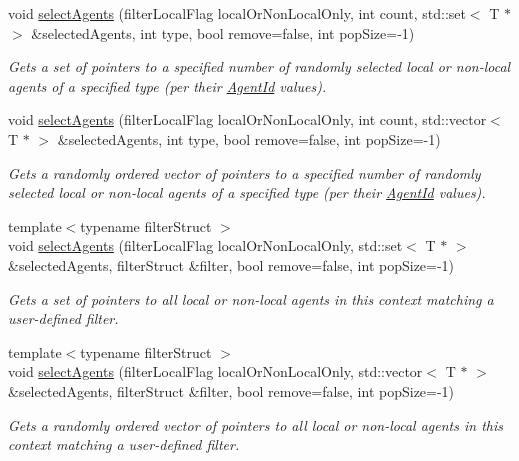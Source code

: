 \begin{DoxyCompactItemize}
void \hyperlink{classrepast_1_1_shared_context_a1899bd475820969bb98e1d5d55c4e378}{select\-Agents} (filter\-Local\-Flag local\-Or\-Non\-Local\-Only, int count, std\-::set$<$ T $\ast$ $>$ \&selected\-Agents, int type, bool remove=false, int pop\-Size=-\/1)
\begin{DoxyCompactList}\small\item\em Gets a set of pointers to a specified number of randomly selected local or non-\/local agents of a specified type (per their \hyperlink{classrepast_1_1_agent_id}{Agent\-Id} values). \end{DoxyCompactList}\item 
void \hyperlink{classrepast_1_1_shared_context_a44f8a986ee3580d6b917f3966d3bfc39}{select\-Agents} (filter\-Local\-Flag local\-Or\-Non\-Local\-Only, int count, std\-::vector$<$ T $\ast$ $>$ \&selected\-Agents, int type, bool remove=false, int pop\-Size=-\/1)
\begin{DoxyCompactList}\small\item\em Gets a randomly ordered vector of pointers to a specified number of randomly selected local or non-\/local agents of a specified type (per their \hyperlink{classrepast_1_1_agent_id}{Agent\-Id} values). \end{DoxyCompactList}\item 
{\footnotesize template$<$typename filter\-Struct $>$ }\\void \hyperlink{classrepast_1_1_shared_context_a216f26fff21a3494455fbb07dcb9157c}{select\-Agents} (filter\-Local\-Flag local\-Or\-Non\-Local\-Only, std\-::set$<$ T $\ast$ $>$ \&selected\-Agents, filter\-Struct \&filter, bool remove=false, int pop\-Size=-\/1)
\begin{DoxyCompactList}\small\item\em Gets a set of pointers to all local or non-\/local agents in this context matching a user-\/defined filter. \end{DoxyCompactList}\item 
{\footnotesize template$<$typename filter\-Struct $>$ }\\void \hyperlink{classrepast_1_1_shared_context_a30566b9de19167c8332fe75acbd93aa4}{select\-Agents} (filter\-Local\-Flag local\-Or\-Non\-Local\-Only, std\-::vector$<$ T $\ast$ $>$ \&selected\-Agents, filter\-Struct \&filter, bool remove=false, int pop\-Size=-\/1)
\begin{DoxyCompactList}\small\item\em Gets a randomly ordered vector of pointers to all local or non-\/local agents in this context matching a user-\/defined filter. \end{DoxyCompactList}\item 

\end{DoxyCompactItemize}
